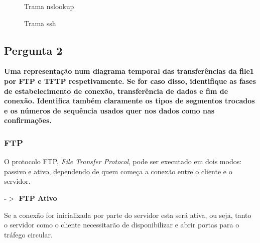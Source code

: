 \documentclass[11pt]{article}
\begin{document}
\begin{figure}[hbt!]
    \centering
    \caption{Trama nslookup}
\end{figure}

\begin{figure}[hbt!]
    \centering
    \caption{Trama ssh}
\end{figure}


\clearpage
\subsection{Pergunta 2}

\textbf{Uma representação num diagrama temporal das transferências da file1 por FTP e TFTP respetivamente. Se for caso disso, identifique as fases de estabelecimento de conexão, transferência de dados e fim de conexão. Identifica também claramente os tipos de segmentos trocados e os números de sequência usados quer nos dados como nas confirmações.}

\subsubsection{FTP}

O protocolo FTP, \textit{File Transfer Protocol}, pode ser executado em dois modos: passivo e ativo, dependendo de quem começa a conexão entre o cliente e o servidor.

\vspace{0.5cm}

\par \textbf{-$>$ FTP Ativo}

\vspace{0.25cm}

Se a conexão for inicializada por parte do servidor esta será ativa, ou seja, tanto o servidor como o cliente necessitarão de disponibilizar e abrir portas para o tráfego circular.
\end{document}
